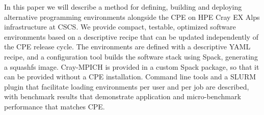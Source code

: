 In this paper we will describe a method for defining, building and deploying alternative programming environments alongside the CPE on HPE Cray EX Alps infrastructure at CSCS.
We provide compact, testable, optimized software environments based on a descriptive recipe that can be updated independently of the CPE release cycle.
The environments are defined with a descriptive YAML recipe, and a configuration tool builds the software stack using Spack, generating a squashfs image.
Cray-MPICH is provided in a custom Spack package, so that it can be provided without a CPE installation.
Command line tools and a SLURM plugin that facilitate loading environments per user and per job are described, with benchmark results that demonstrate application and micro-benchmark performance that matches CPE.

